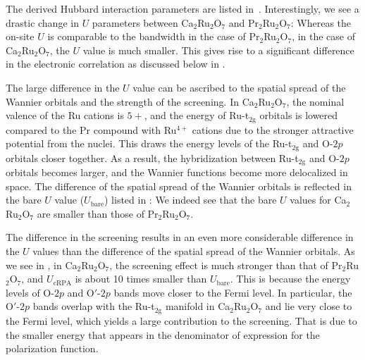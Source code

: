 \documentclass[10pt]{iopart}
\begin{document}
The derived Hubbard interaction parameters are listed in~.
Interestingly, we see a drastic change in $U$ parameters between Ca$_2$Ru$_2$O$_7$ and Pr$_2$Ru$_2$O$_7$: 
Whereas the on-site $U$ is comparable to the bandwidth in the case of Pr$_2$Ru$_2$O$_7$, in the case of Ca$_2$Ru$_2$O$_7$, the $U$ value is much smaller. 
This gives rise to a significant difference in the electronic correlation as discussed below in . 

The large difference in the $U$ value can be ascribed to the spatial spread of the Wannier orbitals and the strength of the screening. 
In Ca$_2$Ru$_2$O$_7$, the nominal valence of the Ru cations is $5+$, and the energy of Ru-t$_{2\mathrm{g}}$ orbitals is lowered compared to the Pr compound with Ru$^{4+}$ cations due to the stronger attractive potential from the nuclei. 
This draws the energy levels of the Ru-t$_{2\mathrm{g}}$ and O-$2p$ orbitals closer together.
As a result, the hybridization between Ru-t$_{2\mathrm{g}}$ and O-$2p$ orbitals becomes larger, and the Wannier functions become more delocalized in space. 
The difference of the spatial spread of the Wannier orbitals is reflected in the bare $U$ value ($U_{\mathrm{bare}}$) listed in : We indeed see that the bare $U$ values for Ca$_2$Ru$_2$O$_7$ are smaller than those of Pr$_2$Ru$_2$O$_7$. 

The difference in the screening results in an even more considerable difference in the $U$ values than the difference of the spatial spread of the Wannier orbitals. 
As we see in , in Ca$_2$Ru$_2$O$_7$, the screening effect is much stronger than that of Pr$_2$Ru$_2$O$_7$, and $U_{\mathrm{cRPA}}$ is about 10 times smaller than $U_{\mathrm{bare}}$. 
This is because the energy levels of O-$2p$ and O$'$-$2p$ bands move closer to the Fermi level. 
In particular, the O$'$-$2p$ bands overlap with the Ru-t$_{2\mathrm{g}}$ manifold in Ca$_2$Ru$_2$O$_7$ and lie very close to the Fermi level, which yields a large contribution to the screening. That is due to the smaller energy that appears in the denominator of expression for the polarization function.
\end{document}
